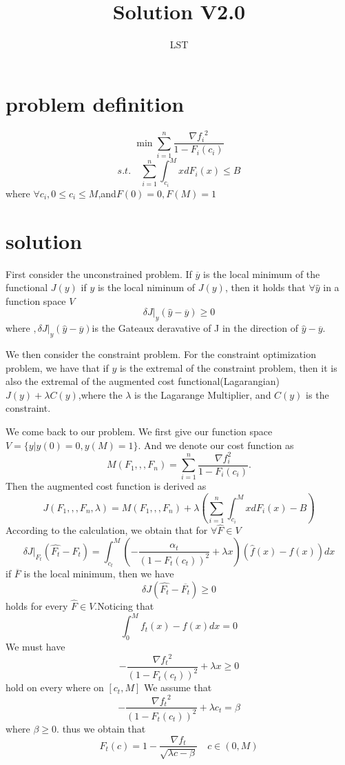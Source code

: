 \documentclass{article}
\begin{document}
\title{Solution V2.0}
\author{LST}
\maketitle
\section{problem definition}


\[\min \sum_{i=1}^n \frac{{\nabla f_i}^2}{1-F_i(c_i)}\]
\[s.t. \quad \sum_{i=1}^n\int_{c_i}^MxdF_i(x)\leq B\]
where $\forall c_i,0\leq c_i\leq M$,and$F(0)=0,F(M)=1$
\section{solution}


First consider the unconstrained problem. If $\overline{y}$ is the local minimum of the functional $J(y)$
if $y$ is the local niminum of $J(y)$, then it holds that $\forall \hat{y}$ in a function space $V$
\[\delta J|_y(\hat{y}-\overline{y})\geq 0\]
where $,\delta J|_y(\hat{y}-\overline{y})$is the Gateaux deravative of J in the direction of $\hat{y}-\overline{y}$. 

We then consider the constraint problem. For the constraint optimization problem, we have that if $y$ is the extremal of the constraint problem, then it is also the extremal of the augmented cost functional(Lagarangian) $J(y)+\lambda C(y)$,where the $\lambda$ is the Lagarange Multiplier, and $C(y)$ is the constraint.

We come back to our problem. We first give our function space $V=\{y|y(0)=0,y(M)=1\}$. And we denote our cost function as
\[M(F_1,,,F_n)= \sum_{i=1}^n \frac{\nabla f_i^2}{1-F_i(c_i)}.\]
Then the augmented cost function is derived as
\[J(F_1,,,F_n,\lambda)=M(F_1,,,F_n)+\lambda( \sum_{i=1}^n\int_{c_i}^MxdF_i(x)-B) \]
According to the calculation, we obtain that for $\forall \hat{F}\in V$
\[\delta J|_{F_t}(\hat{F_t}-F_t)=\int_{c_t}^M(-\frac{\alpha_t}{(1-F_t(c_t))^2}+\lambda x)(\hat{f}(x)-f(x))dx\]
if $\overline{F}$ is the local minimum, then we have
\[\delta J(\hat{F_t}-\overline{F_t})\geq 0\]
holds for every $\hat{F}\in V$.Noticing that
\[\int_0^Mf_t(x)-f(x)dx=0\]
We must have 
\[-\frac{{\nabla f_t}^2}{(1-F_t(c_t))^2}+\lambda x\geq 0\]
hold on every where on $[c_t,M]$
We assume that
\[-\frac{{\nabla f_t}^2}{(1-F_t(c_t))^2}+\lambda c_t= \beta \]
where $\beta \geq 0$. thus we obtain that
\[F_t(c)=1-\frac{\nabla f_t}{\sqrt{\lambda c-\beta}}\quad c\in(0,M)\]
\end{document}
